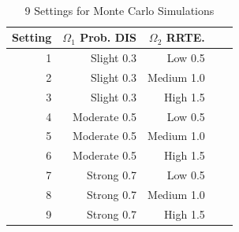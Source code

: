\documentclass{article}
\begin{document}
\begin{table}[!htbp]
\caption {9 Settings for Monte Carlo Simulations}
\centering
{\tt
\begin{tabular}{rrrrr}
\hline
Setting &  $\Omega_1$ Prob. DIS & $\Omega_2$  RRTE. \\
\hline
1 & Slight\hspace{1mm} 0.3& Low\hspace{1mm} 0.5 \\ 
2 & Slight\hspace{1mm} 0.3& Medium\hspace{1mm} 1.0 \\ 
3 & Slight\hspace{1mm} 0.3& High\hspace{1mm} 1.5 \\ 
4 & Moderate\hspace{1mm} 0.5& Low\hspace{1mm} 0.5 \\ 
5 & Moderate\hspace{1mm} 0.5& Medium\hspace{1mm} 1.0 \\ 
6 & Moderate\hspace{1mm} 0.5& High\hspace{1mm} 1.5 \\ 
7 & Strong\hspace{1mm} 0.7& Low\hspace{1mm} 0.5 \\ 
8 & Strong\hspace{1mm} 0.7& Medium\hspace{1mm} 1.0 \\ 
9 & Strong\hspace{1mm} 0.7& High\hspace{1mm} 1.5 \\ 
\hline
\end{tabular}}
\end{table}
\end{document}
